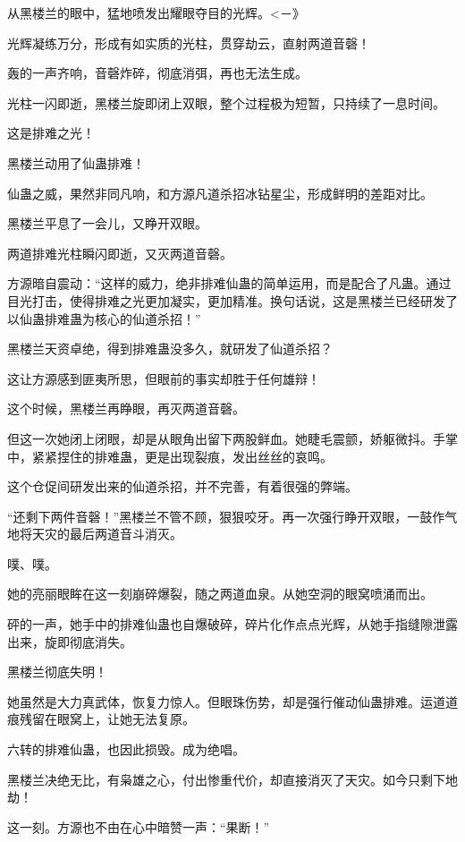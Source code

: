 
\begin{this_body}

从黑楼兰的眼中，猛地喷发出耀眼夺目的光辉。<－》

光辉凝练万分，形成有如实质的光柱，贯穿劫云，直射两道音磬！

轰的一声齐响，音磬炸碎，彻底消弭，再也无法生成。

光柱一闪即逝，黑楼兰旋即闭上双眼，整个过程极为短暂，只持续了一息时间。

这是排难之光！

黑楼兰动用了仙蛊排难！

仙蛊之威，果然非同凡响，和方源凡道杀招冰钻星尘，形成鲜明的差距对比。

黑楼兰平息了一会儿，又睁开双眼。

两道排难光柱瞬闪即逝，又灭两道音磬。

方源暗自震动：“这样的威力，绝非排难仙蛊的简单运用，而是配合了凡蛊。通过目光打击，使得排难之光更加凝实，更加精准。换句话说，这是黑楼兰已经研发了以仙蛊排难蛊为核心的仙道杀招！”

黑楼兰天资卓绝，得到排难蛊没多久，就研发了仙道杀招？

这让方源感到匪夷所思，但眼前的事实却胜于任何雄辩！

这个时候，黑楼兰再睁眼，再灭两道音磬。

但这一次她闭上闭眼，却是从眼角出留下两股鲜血。她睫毛震颤，娇躯微抖。手掌中，紧紧捏住的排难蛊，更是出现裂痕，发出丝丝的哀鸣。

这个仓促间研发出来的仙道杀招，并不完善，有着很强的弊端。

“还剩下两件音磬！”黑楼兰不管不顾，狠狠咬牙。再一次强行睁开双眼，一鼓作气地将天灾的最后两道音斗消灭。

噗、噗。

她的亮丽眼眸在这一刻崩碎爆裂，随之两道血泉。从她空洞的眼窝喷涌而出。

砰的一声，她手中的排难仙蛊也自爆破碎，碎片化作点点光辉，从她手指缝隙泄露出来，旋即彻底消失。

黑楼兰彻底失明！

她虽然是大力真武体，恢复力惊人。但眼珠伤势，却是强行催动仙蛊排难。运道道痕残留在眼窝上，让她无法复原。

六转的排难仙蛊，也因此损毁。成为绝唱。

黑楼兰决绝无比，有枭雄之心，付出惨重代价，却直接消灭了天灾。如今只剩下地劫！

这一刻。方源也不由在心中暗赞一声：“果断！”


\end{this_body}
